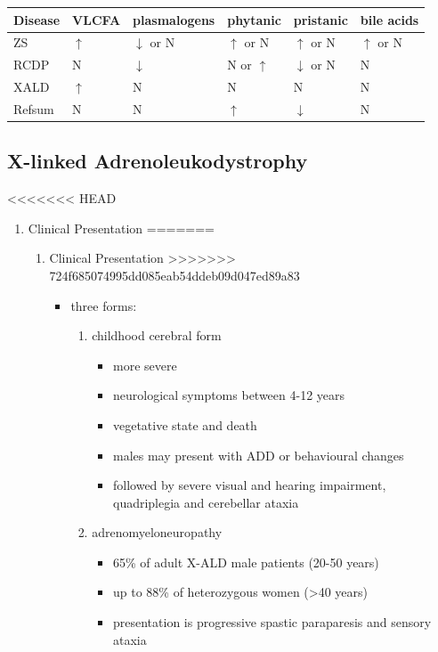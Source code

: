 \documentclass[fontsize=12pt]{scrartcl}
\begin{document}
\begin{enumerate}
\begin{enumerate}
\begin{enumerate}
\begin{enumerate}
\begin{table}[htbp]
\begin{enumerate}
\begin{enumerate}
\begin{enumerate}
\begin{enumerate}
\begin{enumerate}
\begin{enumerate}
\begin{enumerate}
\begin{center}
\begin{tabular}{llllll}
Disease & VLCFA & plasmalogens & phytanic & pristanic & bile acids\\
\hline
ZS & \(\uparrow\) & \(\downarrow\) or N & \(\uparrow\) or N & \(\uparrow\) or N & \(\uparrow\) or N\\
RCDP & N & \(\downarrow\) & N or \(\uparrow\) & \(\downarrow\) or N & N\\
XALD & \(\uparrow\) & N & N & N & N\\
Refsum & N & N & \(\uparrow\) & \(\downarrow\) & N\\
\end{tabular}
\end{center}

\subsection{X-linked Adrenoleukodystrophy}
<<<<<<< HEAD
\label{sec:orgdd9a3b3}
\begin{enumerate}
\item Clinical Presentation
\label{sec:org44436c3}
=======
\label{sec:orgeb7205e}
\begin{enumerate}
\item Clinical Presentation
\label{sec:orgf836660}
>>>>>>> 724f685074995dd085eab54ddeb09d047ed89a83
\begin{itemize}
\item three forms:
\begin{enumerate}
\item childhood cerebral form
\begin{itemize}
\item more severe
\item neurological symptoms between 4-12 years
\item vegetative state and death
\item males may present with ADD or behavioural changes
\item followed by severe visual and hearing impairment, quadriplegia and
cerebellar ataxia
\end{itemize}
\item adrenomyeloneuropathy
\begin{itemize}
\item 65\% of adult X-ALD male patients (20-50 years)
\item up to 88\% of heterozygous women (\textgreater{}40 years)
\item presentation is progressive spastic paraparesis and sensory ataxia

\end{itemize}
\end{enumerate}
\end{itemize}
\end{enumerate}
\end{enumerate}
\end{enumerate}
\end{enumerate}
\end{enumerate}
\end{enumerate}
\end{enumerate}
\end{enumerate}
\end{enumerate}
\end{table}
\end{enumerate}
\end{enumerate}
\end{enumerate}
\end{enumerate}
\end{document}
